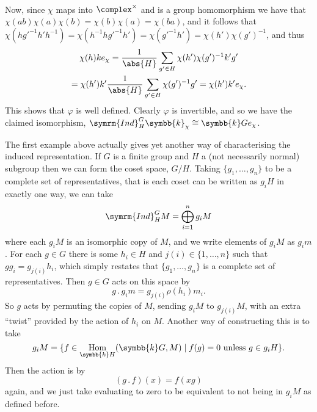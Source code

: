 \documentclass[fleqn]{NotesClass}
\renewcommand{\field}{\symbb{k}}
\DeclareMathOperator{\Hom}{Hom}
\newcommand{\action}{\mathbin{.}}
\newcommand{\isomorphic}{\cong}
\newcommand{\Ind}{\symrm{Ind}}
\begin{document}
\begin{exm}{}{}
\begin{align}
        \end{align}
        Now, since \(\chi\) maps into \(\complex^{\times}\) and is a group homomorphism we have that \(\chi(ab) \chi(a)\chi(b) = \chi(b)\chi(a) = \chi(ba)\), and it follows that \(\chi(hg'^{-1}h'h^{-1}) = \chi(h^{-1}hg'^{-1}h') = \chi(g'^{-1}h') = \chi(h')\chi(g')^{-1}\), and thus
        \begin{multline}
            \chi(h)ke_\chi = \frac{1}{\abs{H}} \sum_{g' \in H} \chi(h')\chi(g')^{-1}k'g'\\
            = \chi(h')k' \frac{1}{\abs{H}} \sum_{g' \in H} \chi(g')^{-1}g' = \chi(h')k'e_\chi.
        \end{multline}
        This shows that \(\varphi\) is well defined.
        Clearly \(\varphi\) is invertible, and so we have the claimed isomorphism, \(\Ind^G_H\field_{\chi} \isomorphic \field Ge_{\chi}\).
    \end{exm}
    
    The first example above actually gives yet another way of characterising the induced representation.
    If \(G\) is a finite group and \(H\) a (not necessarily normal) subgroup then we can form the coset space, \(G/H\).
    Taking \(\{g_1, \dotsc, g_n\}\) to be a complete set of representatives, that is each coset can be written as \(g_i H\) in exactly one way, we can take
    \begin{equation}
        \Ind^G_H M = \bigoplus_{i=1}^n g_iM
    \end{equation}
    where each \(g_i M\) is an isomorphic copy of \(M\), and we write elements of \(g_i M\) as \(g_i m\).
    For each \(g \in G\) there is some \(h_i \in H\) and \(j(i) \in \{1, \dotsc, n\}\) such that \(gg_i = g_{j(i)}h_i\), which simply restates that \(\{g_1, \dotsc, g_n\}\) is a complete set of representatives. 
    Then \(g \in G\) acts on this space by
    \begin{equation}
        g \action g_i m = g_{j(i)} \rho(h_i)m_i.
    \end{equation}
    So \(g\) acts by permuting the copies of \(M\), sending \(g_iM\) to \(g_{j(i)}M\), with an extra \enquote{twist} provided by the action of \(h_i\) on \(M\).
    Another way of constructing this is to take
    \begin{equation}
        g_i M = \{f \in \Hom_{\field H}(\field G, M) \mid f(g) = 0 \text{ unless } g \in g_i H\}.
    \end{equation}
    Then the action is by
    \begin{equation}
        (g \action f)(x) = f(xg)
    \end{equation}
    again, and we just take evaluating to zero to be equivalent to not being in \(g_i M\) as defined before.
    
\end{document}

